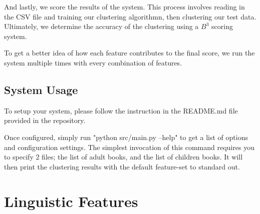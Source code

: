 \documentclass[]{article}
\begin{document}
And lastly, we score the results of the system.
This process involves reading in the CSV file and training our clustering algorithmn, then clustering our test data.
Ultimately, we determine the accuracy of the clustering using a $B^3$ scoring system.

To get a better idea of how each feature contributes to the final score, we run the system multiple times with every combination of features.

\subsection{System Usage}

To setup your system, please follow the instruction in the README.md file provided in the repository.

Once configured, simply run "python src/main.py --help" to get a list of options and configuration settings.
The simplest invocation of this command requires you to specify 2 files; the list of adult books, and the list of children books.
It will then print the clustering results with the default feature-set to standard out.

\section{Linguistic Features}
\end{document}
